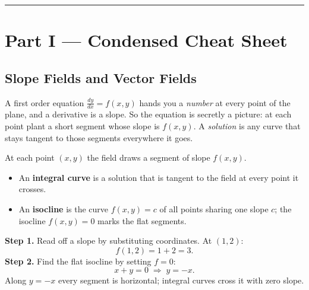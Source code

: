 \vspace{0.6em}
\hrule
\vspace{0.6em}

{}
\section*{Part I --- Condensed Cheat Sheet}
\setcounter{section}{3}   %

\subsection{Slope Fields and Vector Fields}

A first order equation $\frac{dy}{dx} = f(x,y)$ hands you a \emph{number} at
every point of the plane, and a derivative is a slope. So the equation is
secretly a picture: at each point plant a short segment whose slope is
$f(x,y)$. A \emph{solution} is any curve that stays tangent to those segments
everywhere it goes.

\begin{formulabox}
At each point $(x,y)$ the field draws a segment of slope $f(x,y)$.
\begin{itemize}[leftmargin=1.4em, itemsep=2pt]
    \item An \textbf{integral curve} is a solution that is tangent to the field
          at every point it crosses.
    \item An \textbf{isocline} is the curve $f(x,y) = c$ of all points sharing
          one slope $c$; the isocline $f(x,y)=0$ marks the flat segments.
\end{itemize}
\end{formulabox}

\begin{examplebox}[Worked Example 3.1: The field of $\frac{dy}{dx}=x+y$]
\textbf{Step 1.} Read off a slope by substituting coordinates. At $(1,2)$:
\[ f(1,2) = 1 + 2 = 3. \]
\textbf{Step 2.} Find the flat isocline by setting $f=0$:
\[ x + y = 0 \;\Longrightarrow\; y = -x. \]
Along $y=-x$ every segment is horizontal; integral curves cross it with zero
slope.
\end{examplebox}

